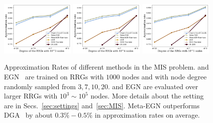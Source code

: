 \begin{figure}[t]
         \centering
         \includegraphics[width=0.32\textwidth]{iclr2023/img/intro/mis_10_3.pdf}
     \hfill
         \includegraphics[width=0.32\textwidth]{iclr2023/img/intro/mis_10_4.pdf}
     \hfill
         \includegraphics[width=0.32\textwidth]{iclr2023/img/intro/mis_10_5.pdf}
     \vspace{-0.3cm}
        \caption{Approximation Rates of different methods in the MIS problem.  \proj and EGN~\citep{karalias2020erdos} are trained on RRGs with $1000$ nodes and with node degree randomly sampled from $3,7,10,20$. \proj and EGN are evaluated over larger RRGs with $10^3\sim10^5$ nodes. More details about the setting are in Secs.~\ref{sec:settings} and~\ref{sec:MIS}. Meta-EGN outperforms DGA~\citep{angelini2019monte} by about $0.3\%-0.5\%$ in approximation rates on average.}
        \label{fig:mis}
        \vspace{-0.6cm}
        
\end{figure}

